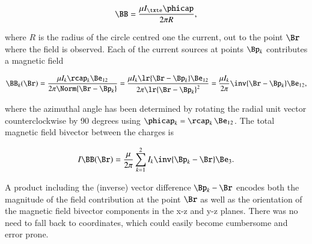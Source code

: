 \begin{dmath}\label{eqn:amperesLawMagnetostaticsExample:60}
\BB
= \frac{\mu I_\txte \phicap}{2 \pi R},
\end{dmath}

where \( R \) is the radius of the circle centred one the current, out to the point \( \Br \) where the field is observed.
Each of the current sources at points \( \Bp_k \) contributes a magnetic field

\begin{dmath}\label{eqn:amperesLawMagnetostaticsExample:80}
\BB_k(\Br)
= \frac{\mu I_k \rcap_k \Be_{12} }{2 \pi \Norm{ \Br - \Bp_k} }
= \frac{\mu I_k \lr{ \Br - \Bp_k} \Be_{12} }{2 \pi \lr{ \Br - \Bp_k}^2 }
= \frac{\mu I_k}{2\pi} \inv{ \Br - \Bp_k} \Be_{12},
\end{dmath}

where the azimuthal angle has been determined by rotating the radial unit vector counterclockwise by 90 degrees using \( \phicap_k = \rcap_k\, \Be_{12} \).
The total magnetic field bivector between the charges is

\begin{equation}\label{eqn:amperesLawMagnetostaticsExample:100}
I \BB(\Br)
= \frac{\mu}{2\pi} \sum_{k = 1}^2 I_k \inv{\Bp_k - \Br } \Be_3.
\end{equation}

A product including the (inverse) vector difference \( \Bp_k - \Br \) encodes both the magnitude of the field contribution at the point \( \Br \) as well as the orientation of the magnetic field bivector components in the x-z and y-z planes.
There was no need to fall back to coordinates, which could easily become cumbersome and error prone.
